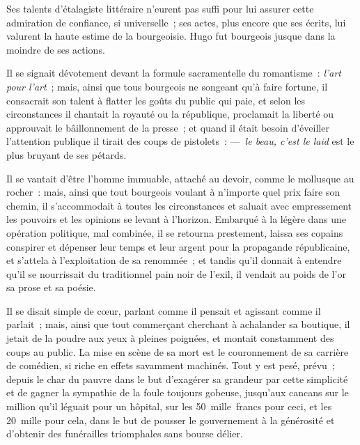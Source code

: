 \documentclass[french,twoside]{book} %
\begin{document}
Ses talents d’étalagiste littéraire n’eurent pas suffi pour lui assurer cette admiration de confiance, si  
\label{p56}universelle ; ses actes, plus encore que ses écrits, lui valurent la haute estime de la bourgeoisie. Hugo fut bourgeois jusque dans la moindre de ses actions.\par
Il se signait dévotement devant la formule sacramentelle du romantisme : {\itshape l’art pour l’art} ; mais, ainsi que tous bourgeois ne songeant qu’à faire fortune, il consacrait son talent à flatter les goûts du public qui paie, et selon les circonstances il chantait la royauté ou la république, proclamait la liberté ou approuvait le bâillonnement de la presse ; et quand il était besoin d’éveiller l’attention publique il tirait des coups de pistolets : — {\itshape le beau, c’est le laid} est le plus bruyant de ses pétards.\par
Il se vantait d’être l’homme immuable, attaché au devoir, comme le mollusque au rocher : mais, ainsi que tout bourgeois voulant à n’importe quel prix faire son chemin, il s’accommodait à toutes les circonstances et saluait avec empressement les pouvoirs et les opinions se levant à l’horizon. Embarqué à la légère dans une opération politique, mal combinée, il se retourna prestement, laissa ses copains conspirer et dépenser leur temps et leur argent pour la propagande républicaine, et s’attela à l’exploitation de sa renommée ; et tandis qu’il donnait à entendre qu’il se nourrissait du traditionnel pain noir de l’exil, il vendait au poids de l’or sa prose et sa poésie.\par
Il se disait simple de cœur, parlant comme il pensait et agissant comme il parlait ; mais, ainsi que tout commerçant cherchant à achalander sa boutique, il jetait de la poudre aux yeux à pleines poignées, et montait constamment des coups au public.  
\label{p57}La mise en scène de sa mort est le couronnement de sa carrière de comédien, si riche en effets savamment machinés. Tout y est pesé, prévu ; depuis le char du pauvre dans le but d’exagérer sa grandeur par cette simplicité et de gagner la sympathie de la foule toujours gobeuse, jusqu’aux cancans sur le million qu’il léguait pour un hôpital, sur les 50 mille francs pour ceci, et les 20 mille pour cela, dans le but de pousser le gouvernement à la générosité et d’obtenir des funérailles triomphales sans bourse délier.\par
\end{document}

